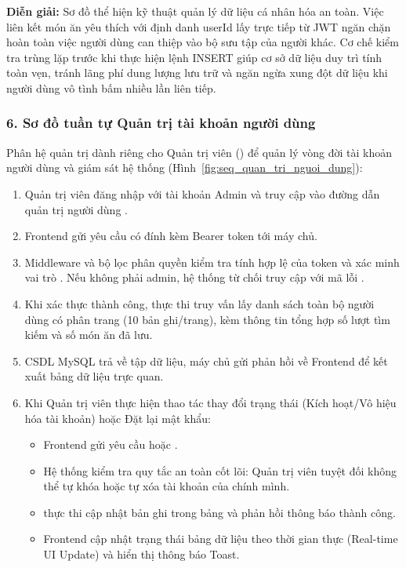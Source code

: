 \noindent\textbf{Diễn giải:} Sơ đồ thể hiện kỹ thuật quản lý dữ liệu cá nhân hóa an toàn. Việc liên kết món ăn yêu thích với định danh userId lấy trực tiếp từ JWT ngăn chặn hoàn toàn việc người dùng can thiệp vào bộ sưu tập của người khác. Cơ chế kiểm tra trùng lặp trước khi thực hiện lệnh INSERT giúp cơ sở dữ liệu duy trì tính toàn vẹn, tránh lãng phí dung lượng lưu trữ và ngăn ngừa xung đột dữ liệu khi người dùng vô tình bấm nhiều lần liên tiếp.

\subsubsection{6. Sơ đồ tuần tự Quản trị tài khoản người dùng}

Phân hệ quản trị dành riêng cho Quản trị viên () để quản lý vòng đời tài khoản người dùng và giám sát hệ thống (Hình~\ref{fig:seq_quan_tri_nguoi_dung}):
\begin{enumerate}[leftmargin=1.6em, itemsep=2pt]
  \item Quản trị viên đăng nhập với tài khoản Admin và truy cập vào đường dẫn quản trị người dùng .
  \item Frontend gửi yêu cầu  có đính kèm Bearer token tới máy chủ.
  \item Middleware  và bộ lọc phân quyền  kiểm tra tính hợp lệ của token và xác minh vai trò . Nếu không phải admin, hệ thống từ chối truy cập với mã lỗi .
  \item Khi xác thực thành công,  thực thi truy vấn lấy danh sách toàn bộ người dùng có phân trang (10 bản ghi/trang), kèm thông tin tổng hợp số lượt tìm kiếm và số món ăn đã lưu.
  \item CSDL MySQL trả về tập dữ liệu, máy chủ gửi phản hồi  về Frontend để kết xuất bảng dữ liệu trực quan.
  \item Khi Quản trị viên thực hiện thao tác thay đổi trạng thái (Kích hoạt/Vô hiệu hóa tài khoản) hoặc Đặt lại mật khẩu:
  \begin{itemize}
    \item Frontend gửi yêu cầu  hoặc .
    \item Hệ thống kiểm tra quy tắc an toàn cốt lõi: Quản trị viên tuyệt đối không thể tự khóa hoặc tự xóa tài khoản của chính mình.
    \item {} thực thi cập nhật bản ghi trong bảng  và phản hồi thông báo thành công.
    \item Frontend cập nhật trạng thái bảng dữ liệu theo thời gian thực (Real-time UI Update) và hiển thị thông báo Toast.
  \end{itemize}
\end{enumerate}

